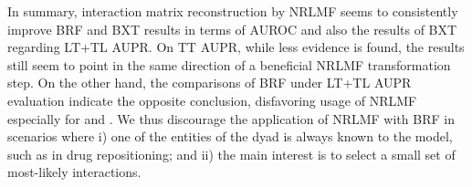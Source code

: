 






In summary, interaction matrix reconstruction by NRLMF seems to consistently improve BRF and BXT results in terms of AUROC and also the results of BXT regarding LT+TL AUPR. On TT AUPR, while less evidence is found, the results still seem to point in the same direction of a beneficial NRLMF transformation step. On the other hand, the comparisons of BRF under LT+TL AUPR evaluation indicate the opposite conclusion, disfavoring usage of NRLMF especially for  and . We thus discourage the application of NRLMF with BRF in scenarios where i) one of the entities of the dyad is always known to the model, such as in drug repositioning; and ii) the main interest is to select a small set of most-likely interactions.

